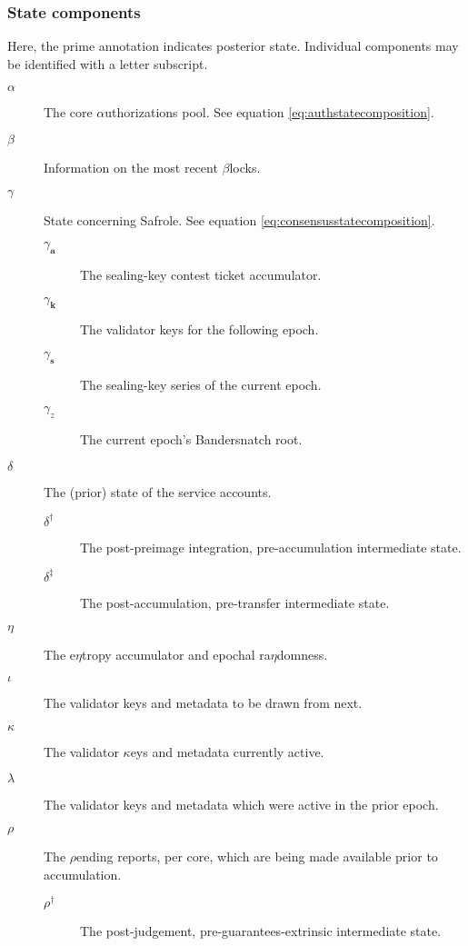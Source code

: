 \subsubsection{State components}

Here, the prime annotation indicates posterior state. Individual components may be identified with a letter subscript.
\begin{description}
  \item[$\alpha$] The core $\alpha$uthorizations pool. See equation \ref{eq:authstatecomposition}. %
  \item[$\beta$] Information on the most recent $\beta$locks. %
  \item[$\gamma$] State concerning Safrole. See equation \ref{eq:consensusstatecomposition}. %
  \begin{description}
    \item[$\gamma_\mathbf{a}$] The sealing-key contest ticket accumulator.
    \item[$\gamma_\mathbf{k}$] The validator keys for the following epoch.
    \item[$\gamma_\mathbf{s}$] The sealing-key series of the current epoch.
    \item[$\gamma_z$] The current epoch's Bandersnatch root.
  \end{description}
  \item[$\delta$] The (prior) state of the service accounts. %
  \begin{description}
    \item[$\delta^\dagger$] The post-preimage integration, pre-accumulation intermediate state. %
    \item[$\delta^\ddagger$] The post-accumulation, pre-transfer intermediate state. %
  \end{description}
  \item[$\eta$] The e$\eta$tropy accumulator and epochal ra$\eta$domness. %
  \item[$\iota$] The validator keys and metadata to be drawn from next. %
  \item[$\kappa$] The validator $\kappa$eys and metadata currently active. %
  \item[$\lambda$] The validator keys and metadata which were active in the prior epoch. %
  \item[$\rho$] The $\rho$ending reports, per core, which are being made available prior to accumulation. %
  \begin{description}
    \item[$\rho^\dagger$] The post-judgement, pre-guarantees-extrinsic intermediate state. %

\end{description}
\end{description}
